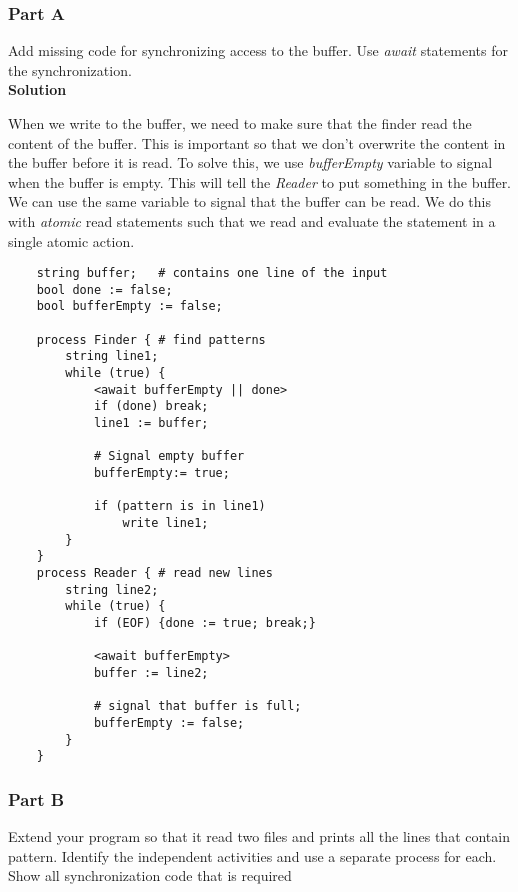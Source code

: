 \subsubsection{Part A}

Add missing code for synchronizing access to the buffer. Use \textit{await} statements for the synchronization. \\

\textbf{Solution}

When we write to the buffer, we need to make sure that the finder read the content of the buffer.
This is important so that we don't overwrite the content in the buffer before it is read. To solve this, we use
\textit{bufferEmpty} variable to signal when the buffer is empty. This will tell the \textit{Reader} to put something in the buffer.
We can use the same variable to signal that the buffer can be read. We do this with \textit{atomic} read statements such that we read and evaluate the statement in a single atomic action.  

\begin{lstlisting}
    string buffer;   # contains one line of the input
    bool done := false;
    bool bufferEmpty := false; 

    process Finder { # find patterns
        string line1;
        while (true) {
            <await bufferEmpty || done>
            if (done) break;
            line1 := buffer;

            # Signal empty buffer 
            bufferEmpty:= true;
         
            if (pattern is in line1)
                write line1;
        }
    }
    process Reader { # read new lines
        string line2;
        while (true) {
            if (EOF) {done := true; break;}

            <await bufferEmpty>
            buffer := line2;

            # signal that buffer is full;
            bufferEmpty := false; 
        }
    }
\end{lstlisting}

\subsubsection{Part B}

Extend your program so that it read two files and prints all the lines that contain pattern.
Identify the independent activities and use a separate process for each. 
Show all synchronization code that is required \\


